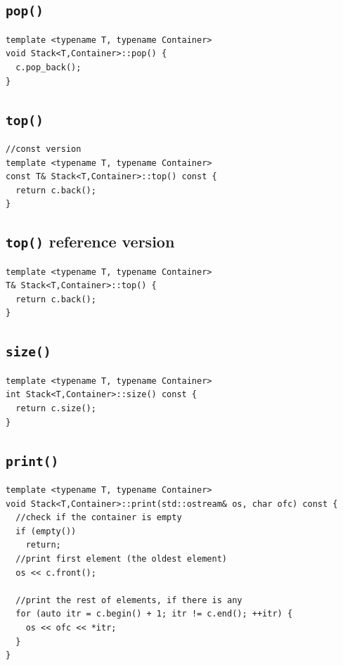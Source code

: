 \documentclass[11pt]{book}
\begin{document}
\subsection{\texttt{pop()}}
\label{sec:org22a1eb2}
\begin{verbatim}
template <typename T, typename Container>
void Stack<T,Container>::pop() {
  c.pop_back();
}
\end{verbatim}
\subsection{\texttt{top()}}
\label{sec:orgb9d0a13}
\begin{verbatim}
//const version 
template <typename T, typename Container>
const T& Stack<T,Container>::top() const {
  return c.back();
}
\end{verbatim}
\subsection{\texttt{top()} reference version}
\label{sec:org0854c21}
\begin{verbatim}
template <typename T, typename Container>
T& Stack<T,Container>::top() {
  return c.back();
}
\end{verbatim}
\subsection{\texttt{size()}}
\label{sec:orga08ad61}
\begin{verbatim}
template <typename T, typename Container>
int Stack<T,Container>::size() const {
  return c.size();
}
\end{verbatim}
\subsection{\texttt{print()}}
\label{sec:org9386590}
\begin{verbatim}
template <typename T, typename Container>
void Stack<T,Container>::print(std::ostream& os, char ofc) const {
  //check if the container is empty
  if (empty())
    return;
  //print first element (the oldest element)
  os << c.front();

  //print the rest of elements, if there is any
  for (auto itr = c.begin() + 1; itr != c.end(); ++itr) {
    os << ofc << *itr;
  } 
}
\end{verbatim}
\end{document}
